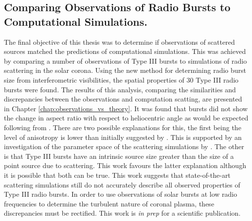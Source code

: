 \subsection{Comparing Observations of Radio Bursts to Computational Simulations.}
The final objective of this thesis was to determine if observations of scattered sources matched the predictions of computational simulations. This was achieved by comparing a number of observations of Type III bursts to simulations of radio scattering in the solar corona.
Using the new method for determining radio burst size from interferometric visibilities, the spatial properties of 30 Type III radio bursts were found. The results of this analysis, comparing the similarities and discrepancies between the observations and computation scatting, are presented in Chapter \ref{chap:observations_vs_theory}.%
It was found that bursts did not show the change in aspect ratio with respect to heliocentric angle as would be expected following from \cite{Kontar2019}. There are two possible explanations for this, the first being the level of anisotropy is lower than initially suggested by \cite{Kontar2019}. This is supported by an investigation of the parameter space of the scattering simulations by \cite{Zhang2021}. The other is that Type III bursts have an intrinsic source size greater than the size of a point source due to scattering. This work favours the latter explanation although it is possible that both can be true. This work suggests that state-of-the-art scattering simulations still do not accurately describe all observed properties of Type III radio bursts. In order to use observations of solar bursts at low radio frequencies to determine the turbulent nature of coronal plasma, these discrepancies must be rectified. This work is \textit{in prep} for a scientific publication.

